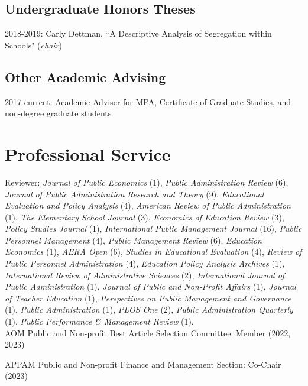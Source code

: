 \documentclass[margin,line]{res}
\begin{document}
\begin{resume}
\vspace*{-.1in}
\subsection{\sc Undergraduate Honors Theses}
\vspace*{-.1in}
2018-2019: Carly Dettman, ``A Descriptive Analysis of Segregation within Schools" (\textit{chair})\\

\vspace*{-.1in}
\subsection{\sc Other Academic Advising}
\vspace*{-.1in}
2017-current: Academic Adviser for MPA, Certificate of Graduate Studies, and non-degree graduate students\\

\section{\sc Professional Service}
Reviewer: {\em Journal of Public Economics} (1), {\em Public Administration Review} (6), {\em Journal of Public Administration Research and Theory} (9), {\em Educational Evaluation and Policy Analysis} (4), {\em American Review of Public Administration} (1), {\em The Elementary School Journal} (3), {\em Economics of Education Review} (3), {\em Policy Studies Journal} (1), {\em International Public Management Journal} (16), {\em Public Personnel Management} (4), {\em Public Management Review} (6), {\em Education Economics} (1), {\em AERA Open} (6), {\em Studies in Educational Evaluation} (4), {\em Review of Public Personnel Administration} (4), {\em Education Policy Analysis Archives} (1), {\em International Review of Administrative Sciences} (2), {\em International Journal of Public Administration} (1), {\em Journal of Public and Non-Profit Affairs} (1), {\em Journal of Teacher Education} (1), {\em Perspectives on Public Management and Governance} (1), {\em Public Administration} (1), {\em PLOS One} (2), {\em Public Administration Quarterly} (1), {\em Public Performance \& Management Review} (1).\\

AOM Public and Non-profit Best Article Selection Committee: Member (2022, 2023)

APPAM Public and Non-profit Finance and Management Section: Co-Chair (2023)


\end{resume}
\end{document}
